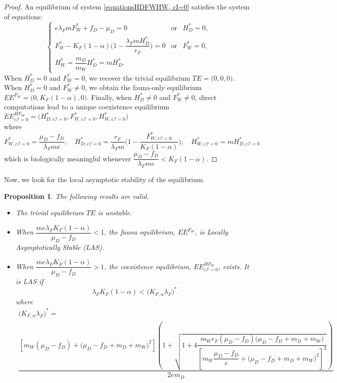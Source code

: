\documentclass{article}
\newcommand{\lfw}{\lambda_{F}}
\newcommand{\lfw}{\lambda_{F}}
\newcommand{\Kfa}{K_{F,\alpha}}
\newcommand{\cI}{c \mathcal{I}}
\newtheorem{prop}{Proposition}
\begin{document}
\begin{proof}
An equilibrium of system \eqref{equationsHDFWHW, cI=0} satisfies the system of equations:
\begin{equation}\label{system-equilibre, cI=0}
\left\lbrace \begin{array}{cll}
 e \lfw m F_W^* + f_D - \mu_D = 0& \mbox{or} & H_D^* = 0,\\
F_W^* - K_F(1-\alpha) \Big(1 - \dfrac{\lfw m H^*_D}{r_F} \Big) = 0& \mbox{or} & F^*_W = 0,\\
H_W^* = \dfrac{m_D}{m_W} H_D^* = m H_D^*.&&
\end{array} \right.
\end{equation}
When $H_D^*=0$ and $F_W^*=0$, we recover the trivial equilibrium $TE = \Big(0,0,0\Big)$. When $H_D^*=0$ and $F_W^*\neq0$, we obtain the fauna-only equilibrium $EE^{F_W} = \Big(0, K_F(1-\alpha), 0 \Big)$. Finally, when $H_D^*\neq0$ and $F_W^*\neq0$, direct computations lead to a unique coexistence equilibrium 
$EE^{HF_W}_{\cI = 0} = \Big(H^*_{D, \cI = 0}, F^*_{W, \cI = 0}, H^*_{W, \cI = 0} \Big)$ \\ 
where 
$$
F^*_{W, \cI = 0} = \dfrac{\mu_D - f_D}{\lfw m e},
\quad
H^*_{D, \cI = 0} = \dfrac{r_F}{\lfw m} \Big(1 - \dfrac{F^*_{W, \cI = 0}}{K_F(1-\alpha)} \Big),
\quad
H^*_{W, \cI = 0} = m H^*_{D, \cI = 0}
$$
which is biologically meaningful whenever $\dfrac{\mu_D - f_D}{\lfw m e} < K_F(1-\alpha).$
\end{proof}

Now, we look for the local asymptotic stability of the equilibrium.

\begin{prop}\label{propLAS, cI=0} The following results are valid.
\begin{itemize}
\item The trivial equilibrium $TE$ is unstable.
\item When $\dfrac{m e \lfw K_F(1-\alpha)}{\mu_D - f_D} < 1$, the fauna equilibrium, $EE^{F_W}$, is Locally Asymptotically Stable (LAS).
\item When $\dfrac{m e \lfw K_F(1-\alpha)}{\mu_D - f_D} > 1$, the coexistence equilibrium, $EE^{HF_W}_{\cI =0}$, exists. It is LAS if 
$$
\lfw K_F(1-\alpha) < \Big(\Kfa \lfw \Big)^*
$$
where \begin{multline*}
\Big(\Kfa \lfw \Big)^* = \\
 \dfrac{\left[m_{W}(\mu_{D}-f_{D})+\big(\mu_{D}-f_{D}+m_{D}+m_{W})^{2}\right]\left(1+\sqrt{1+4\dfrac{m_{W}r_{F}\left(\mu_{D}-f_{D}\right)\big(\mu_{D}-f_{D}+m_{D}+m_{W})}{\left[m_{W}\dfrac{\mu_{D}-f_{D}}{e}+\big(\mu_{D}-f_{D}+m_{D}+m_{W})^{2}\right]^{2}}}\right)}{2em_D}
\end{multline*}
\end{itemize}
\end{prop}
\end{document}
